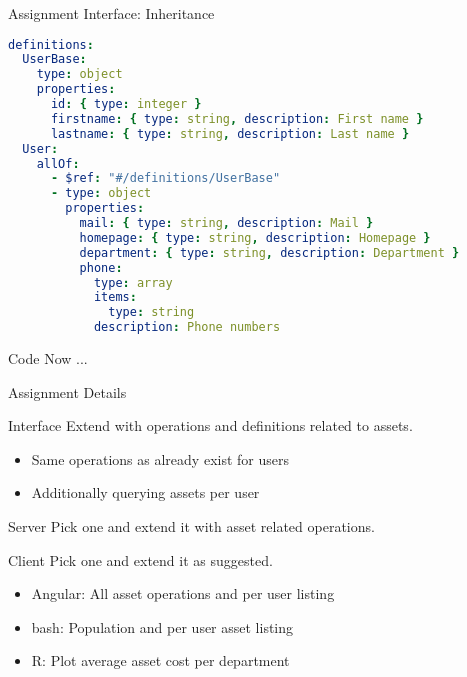 \begin{frame}[fragile]{Assignment Interface: Inheritance}
\begin{lstlisting}[language=yaml,style=mini]
definitions:
  UserBase:
    type: object
    properties:
      id: { type: integer }
      firstname: { type: string, description: First name }
      lastname: { type: string, description: Last name }
  User:
    allOf:
      - $ref: "#/definitions/UserBase"
      - type: object
        properties:
          mail: { type: string, description: Mail }
          homepage: { type: string, description: Homepage }
          department: { type: string, description: Department }
          phone:
            type: array
            items:
              type: string
            description: Phone numbers
\end{lstlisting}
\end{frame}


\begin{frame}{Code Now ...}
\end{frame}


\begin{frame}{Assignment Details}
    \begin{block}{Interface}
        Extend with operations and definitions related to assets.
        \begin{itemize}
            \item Same operations as already exist for users
            \item Additionally querying assets per user
        \end{itemize}
    \end{block}

    \medskip

    \begin{block}{Server}
        Pick one and extend it with asset related operations.
    \end{block}

    \medskip

    \begin{block}{Client}
        Pick one and extend it as suggested.
        \begin{itemize}
            \item Angular: All asset operations and per user listing
            \item bash: Population and per user asset listing
            \item R: Plot average asset cost per department
        \end{itemize}
    \end{block}
\end{frame}



